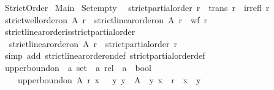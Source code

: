 %
\begin{isabellebody}%
%
%
\isadelimtheory
\isanewline
\isanewline
%
\endisadelimtheory
%
\isatagtheory
{}\isamarkupfalse%
\ Strict{\isacharunderscore}Order\isanewline
\isanewline
{}\ Main\isanewline
\isanewline
{}%
\endisatagtheory
{\isafoldtheory}%
%
\isadelimtheory
\isanewline
%
\endisadelimtheory
\isanewline
{}\isamarkupfalse%
\ Set{\isachardot}empty\ {\isacharparenleft}{\isachardoublequoteopen}{\isasymemptyset}{\isachardoublequoteclose}{\isacharparenright}\isanewline
\isanewline
{}\isamarkupfalse%
\ {\isachardoublequoteopen}strict{\isacharunderscore}partial{\isacharunderscore}order\ r\ {\isasymequiv}\ trans\ r\ {\isasymand}\ irrefl\ r{\isachardoublequoteclose}\isanewline
\isanewline
\isanewline
\isanewline
\isanewline
{}\isamarkupfalse%
\ {\isachardoublequoteopen}strict{\isacharunderscore}well{\isacharunderscore}order{\isacharunderscore}on\ A\ r\ {\isasymequiv}\ strict{\isacharunderscore}linear{\isacharunderscore}order{\isacharunderscore}on\ A\ r\ {\isasymand}\ wf\ r{\isachardoublequoteclose}\isanewline
\isanewline
{}\isamarkupfalse%
\ strict{\isacharunderscore}linear{\isacharunderscore}order{\isacharunderscore}is{\isacharunderscore}strict{\isacharunderscore}partial{\isacharunderscore}order\ {\isacharcolon}\isanewline
\ \ {\isachardoublequoteopen}strict{\isacharunderscore}linear{\isacharunderscore}order{\isacharunderscore}on\ A\ r\ {\isasymLongrightarrow}\ strict{\isacharunderscore}partial{\isacharunderscore}order\ r{\isachardoublequoteclose}\isanewline
%
\isadelimproof
\ \ %
\endisadelimproof
%
\isatagproof
{}\isamarkupfalse%
\ {\isacharparenleft}simp\ add{\isacharcolon}\ strict{\isacharunderscore}linear{\isacharunderscore}order{\isacharunderscore}on{\isacharunderscore}def\ strict{\isacharunderscore}partial{\isacharunderscore}order{\isacharunderscore}def{\isacharparenright}%
\endisatagproof
{\isafoldproof}%
%
\isadelimproof
\isanewline
%
\endisadelimproof
\isanewline
\isanewline
{}\isamarkupfalse%
\ upper{\isacharunderscore}bound{\isacharunderscore}on\ {\isacharcolon}{\isacharcolon}\ {\isachardoublequoteopen}{\isacharprime}a\ set\ {\isasymRightarrow}\ {\isacharprime}a\ rel\ {\isasymRightarrow}\ {\isacharprime}a\ {\isasymRightarrow}\ bool{\isachardoublequoteclose}\isanewline
\ \ \ \isanewline
\ \ \ \ {\isachardoublequoteopen}upper{\isacharunderscore}bound{\isacharunderscore}on\ A\ r\ x\ {\isacharequal}\ {\isacharparenleft}{\isasymforall}\ y{\isachardot}\ y\ {\isasymin}\ A\ {\isasymlongrightarrow}\ {\isacharparenleft}y{\isacharcomma}\ x{\isacharparenright}\ {\isasymin}\ r\ {\isasymor}\ x\ {\isacharequal}\ y{\isacharparenright}{\isachardoublequoteclose}\isanewline

\end{isabellebody}
